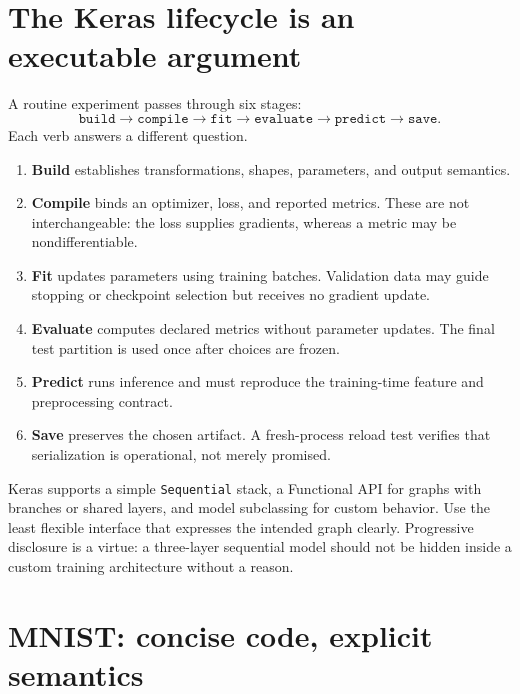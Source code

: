 
\section{The Keras lifecycle is an executable argument}

A routine experiment passes through six stages:
\[
 \texttt{build}\longrightarrow\texttt{compile}\longrightarrow
 \texttt{fit}\longrightarrow\texttt{evaluate}\longrightarrow
 \texttt{predict}\longrightarrow\texttt{save}.
\]
Each verb answers a different question.

\begin{enumerate}
  \item \textbf{Build} establishes transformations, shapes, parameters, and
  output semantics.
  \item \textbf{Compile} binds an optimizer, loss, and reported metrics. These
  are not interchangeable: the loss supplies gradients, whereas a metric may
  be nondifferentiable.
  \item \textbf{Fit} updates parameters using training batches. Validation
  data may guide stopping or checkpoint selection but receives no gradient
  update.
  \item \textbf{Evaluate} computes declared metrics without parameter
  updates. The final test partition is used once after choices are frozen.
  \item \textbf{Predict} runs inference and must reproduce the training-time
  feature and preprocessing contract.
  \item \textbf{Save} preserves the chosen artifact. A fresh-process reload
  test verifies that serialization is operational, not merely promised.
\end{enumerate}

Keras supports a simple \texttt{Sequential} stack, a Functional API for graphs
with branches or shared layers, and model subclassing for custom behavior. Use
the least flexible interface that expresses the intended graph clearly.
Progressive disclosure is a virtue: a three-layer sequential model should not
be hidden inside a custom training architecture without a reason.

\section{MNIST: concise code, explicit semantics}

